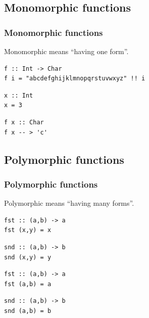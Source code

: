 \documentclass{beamer}
\begin{document}
\subsection{Monomorphic functions}

\begin{frame}[fragile]
\frametitle{Monomorphic functions}

Monomorphic means ``having one form''.

\begin{verbatim}
f :: Int -> Char
f i = "abcdefghijklmnopqrstuvwxyz" !! i
\end{verbatim}

\begin{verbatim}
x :: Int
x = 3
\end{verbatim}

\begin{verbatim}
f x :: Char
f x -- > 'c'
\end{verbatim}

\end{frame}

\subsection{Polymorphic functions}
\begin{frame}[fragile]
\frametitle{Polymorphic functions}

Polymorphic means ``having many forms''.

\begin{verbatim}
fst :: (a,b) -> a
fst (x,y) = x
\end{verbatim}

\begin{verbatim}
snd :: (a,b) -> b
snd (x,y) = y
\end{verbatim}

\begin{verbatim}
fst :: (a,b) -> a
fst (a,b) = a
\end{verbatim}

\begin{verbatim}
snd :: (a,b) -> b
snd (a,b) = b
\end{verbatim}

\end{frame}

\end{document}
